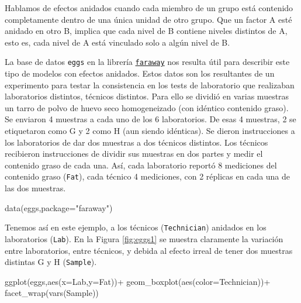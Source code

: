 \documentclass[
]{book}
\newenvironment{Shaded}{\begin{snugshade}}{\end{snugshade}}
\newcommand{\AttributeTok}[1]{\textcolor[rgb]{0.77,0.63,0.00}{#1}}
\newcommand{\FunctionTok}[1]{\textcolor[rgb]{0.00,0.00,0.00}{#1}}
\newcommand{\NormalTok}[1]{#1}
\newcommand{\SpecialCharTok}[1]{\textcolor[rgb]{0.00,0.00,0.00}{#1}}
\newcommand{\StringTok}[1]{\textcolor[rgb]{0.31,0.60,0.02}{#1}}
\begin{document}
Hablamos de efectos anidados cuando cada miembro de un grupo está contenido completamente dentro de una única unidad de otro grupo. Que un factor A esté anidado en otro B, implica que cada nivel de B contiene niveles distintos de A, esto es, cada nivel de A está vinculado solo a algún nivel de B.

La base de datos \texttt{eggs} en la librería \href{https://cran.r-project.org/web/packages/faraway/faraway.pdf}{\texttt{faraway}} nos resulta útil para describir este tipo de modelos con efectos anidados. Estos datos son los resultantes de un experimento para testar la consistencia en los tests de laboratorio que realizaban laboratorios distintos, técnicos distintos. Para ello se dividió en varias muestras un tarro de polvo de huevo seco homogeneizado (con idéntico contenido graso). Se enviaron 4 muestras a cada uno de los 6 laboratorios. De esas 4 muestras, 2 se etiquetaron como G y 2 como H (aun siendo idénticas). Se dieron instrucciones a los laboratorios de dar dos muestras a dos técnicos distintos. Los técnicos recibieron instrucciones de dividir sus muestras en dos partes y medir el contenido graso de cada una. Así, cada laboratorio reportó 8 mediciones del contenido graso (\texttt{Fat}), cada técnico 4 mediciones, con 2 réplicas en cada una de las dos muestras.

\begin{Shaded}
\begin{Highlighting}[]
\FunctionTok{data}\NormalTok{(eggs,}\AttributeTok{package=}\StringTok{"faraway"}\NormalTok{)}
\end{Highlighting}
\end{Shaded}

Tenemos así en este ejemplo, a los técnicos (\texttt{Technician}) anidados en los laboratorios (\texttt{Lab}). En la Figura \ref{fig:eggs1} se muestra claramente la variación entre laboratorios, entre técnicos, y debida al efecto irreal de tener dos muestras distintas G y H (\texttt{Sample}).

\begin{Shaded}
\begin{Highlighting}[]
\FunctionTok{ggplot}\NormalTok{(eggs,}\FunctionTok{aes}\NormalTok{(}\AttributeTok{x=}\NormalTok{Lab,}\AttributeTok{y=}\NormalTok{Fat))}\SpecialCharTok{+}
  \FunctionTok{geom\_boxplot}\NormalTok{(}\FunctionTok{aes}\NormalTok{(}\AttributeTok{color=}\NormalTok{Technician))}\SpecialCharTok{+}
  \FunctionTok{facet\_wrap}\NormalTok{(}\FunctionTok{vars}\NormalTok{(Sample))}
\end{Highlighting}
\end{Shaded}
\end{document}
